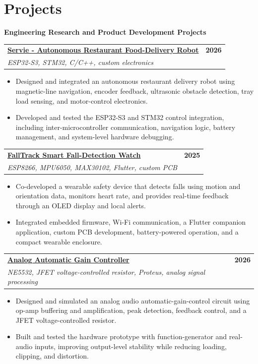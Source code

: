 \documentclass[a4paper,10pt]{article}
\makeatletter
\newcommand{\projectEntry}[3]{%
  \Needspace{9\baselineskip}%
  \begin{tabularx}{\textwidth}{@{}Xr@{}}
    \textbf{#1} & \textbf{\small #3} \\
    {\small\textit{#2}} &
  \end{tabularx}
  \vspace{0.35mm}
}
\newcommand{\projectCategory}[1]{%
  \vspace{1.0mm}
  {\normalsize\bfseries\color{accent} #1}\par
  \vspace{0.75mm}
}
\makeatother
\begin{document}
\section{Projects}

\projectCategory{Engineering Research and Product Development Projects}

\projectEntry
  {\href{https://github.com/hakammra/Restaurent-Robot}{Servie - Autonomous Restaurant Food-Delivery Robot \faGithub}}
  {ESP32-S3, STM32, C/C++, custom electronics}
  {2026}
\begin{itemize}
  \item Designed and integrated an autonomous restaurant delivery robot using magnetic-line navigation, encoder feedback, ultrasonic obstacle detection, tray load sensing, and motor-control electronics.
  \item Developed and tested the ESP32-S3 and STM32 control integration, including inter-microcontroller communication, navigation logic, battery management, and system-level hardware debugging.
\end{itemize}
\vspace{1.35mm}

\projectEntry
  {\href{https://github.com/hakammra/falltrack-watch}{FallTrack Smart Fall-Detection Watch \faGithub}}
  {ESP8266, MPU6050, MAX30102, Flutter, custom PCB}
  {2025}
\begin{itemize}
  \item Co-developed a wearable safety device that detects falls using motion and orientation data, monitors heart rate, and provides real-time feedback through an OLED display and local alerts.
  \item Integrated embedded firmware, Wi-Fi communication, a Flutter companion application, custom PCB development, battery-powered operation, and a compact wearable enclosure.
\end{itemize}
\vspace{1.35mm}

\projectEntry
  {\href{https://github.com/hakammra/automatic-gain-controller}{Analog Automatic Gain Controller \faGithub}}
  {NE5532, JFET voltage-controlled resistor, Proteus, analog signal processing}
  {2026}
\begin{itemize}
  \item Designed and simulated an analog audio automatic-gain-control circuit using op-amp buffering and amplification, peak detection, feedback control, and a JFET voltage-controlled resistor.
  \item Built and tested the hardware prototype with function-generator and real-audio inputs, improving output-level stability while reducing loading, clipping, and distortion.
\end{itemize}
\vspace{1.35mm}
\end{document}

